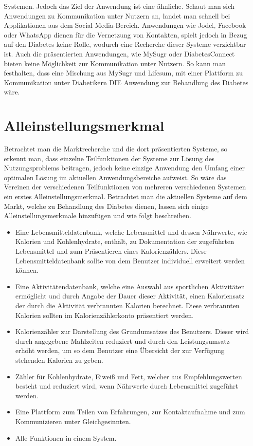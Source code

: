 \documentclass[a4paper,11pt]{article}%
\renewcommand{\\}{\vspace*{0.5\baselineskip} \newline}
\begin{document}
Systemen. Jedoch das Ziel der Anwendung ist eine ähnliche. \newline
	Schaut man sich Anwendungen zu Kommunikation unter Nutzern an, landet man schnell bei Applikationen aus dem Social Media-Bereich. Anwendungen wie Jodel, Facebook oder WhatsApp dienen für die Vernetzung von Kontakten, spielt jedoch in Bezug auf den Diabetes keine Rolle, wodurch eine Recherche dieser Systeme verzichtbar ist. Auch die präsentierten Anwendungen, wie MySugr oder DiabetesConnect bieten keine Möglichkeit zur Kommunikation unter Nutzern. \newline
	So kann man festhalten, dass eine Mischung aus MySugr und Lifesum, mit einer Plattform zu Kommunikation unter Diabetikern DIE Anwendung zur Behandlung des Diabetes wäre.
\newpage

\section{Alleinstellungsmerkmal}
	Betrachtet man die Marktrecherche und die dort präsentierten Systeme, so erkennt man, dass einzelne Teilfunktionen  der Systeme zur Lösung des Nutzungsproblems beitragen, jedoch keine einzige Anwendung den Umfang einer optimalen Lösung im aktuellen Anwendungsbereiche aufweist. So wäre das Vereinen der verschiedenen Teilfunktionen von mehreren verschiedenen Systemen ein erstes Alleinstellungsmerkmal. Betrachtet man die aktuellen Systeme auf dem Markt, welche zu Behandlung des Diabetes dienen, lassen sich einige Alleinstellungsmerkmale hinzufügen und wie folgt beschreiben.
	\begin{itemize}
	\item Eine Lebensmitteldatenbank, welche Lebensmittel und dessen Nährwerte, wie Kalorien und Kohlenhydrate, enthält, zu Dokumentation der zugeführten Lebensmittel und zum Präsentieren eines Kalorienzählers. Diese Lebensmitteldatenbank sollte von dem Benutzer individuell erweitert werden können.
	\item Eine Aktivitätendatenbank, welche eine Auswahl aus sportlichen Aktivitäten ermöglicht und durch Angabe der Dauer dieser Aktivität, einen Kaloriensatz der durch die Aktivität verbrannten Kalorien berechnet. Diese verbrannten Kalorien sollten im Kalorienzählerkonto präsentiert werden.
	\item Kalorienzähler zur Darstellung des Grundumsatzes des Benutzers. Dieser wird durch angegebene Mahlzeiten reduziert und durch den Leistungsumsatz erhöht werden, um so dem Benutzer eine Übersicht der zur Verfügung stehenden Kalorien zu geben.
	\item Zähler für Kohlenhydrate, Eiweiß und Fett, welcher aus Empfehlungswerten besteht und reduziert wird, wenn Nährwerte durch Lebensmittel zugeführt werden.
	\item Eine Plattform zum Teilen von Erfahrungen, zur Kontaktaufnahme und zum Kommunizieren unter Gleichgesinnten. 
	\item Alle Funktionen in einem System.
	\end{itemize}
\end{document}
